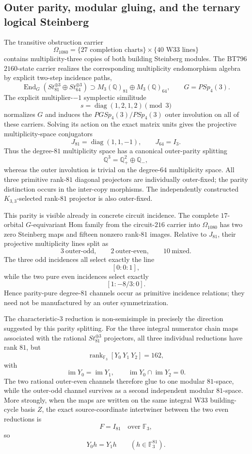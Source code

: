 
\subsection{Outer parity, modular gluing, and the ternary logical Steinberg}

The transitive obstruction carrier
\[
\Omega_{1080}=\{\text{$27$ completion charts}\}\times\{\text{$40$ W33 lines}\}
\]
contains multiplicity-three copies of both building Steinberg modules.  The
BT796 $2160$-state carrier realizes the corresponding multiplicity endomorphism
algebra by explicit two-step incidence paths,
\[
\operatorname{End}_{G}(St_{81}^{\oplus3}\oplus St_{64}^{\oplus3})
\supset M_3(\mathbb Q)_{81}\oplus M_3(\mathbb Q)_{64},
\qquad G=PSp_4(3).
\]
The explicit multiplier-$-1$ symplectic similitude
\[
s=\operatorname{diag}(1,2,1,2)\pmod3
\]
normalizes $G$ and induces the $PGSp_4(3)/PSp_4(3)$ outer involution on all of
these carriers.  Solving its action on the exact matrix units gives the
projective multiplicity-space conjugators
\[
J_{81}=\operatorname{diag}(1,1,-1),
\qquad
J_{64}=I_3.
\]
Thus the degree-$81$ multiplicity space has a canonical outer-parity splitting
\[
\mathbb Q^3=\mathbb Q^2_{+}\oplus\mathbb Q_{-},
\]
whereas the outer involution is trivial on the degree-$64$ multiplicity space.
All three primitive rank-$81$ diagonal projectors are individually outer-fixed;
the parity distinction occurs in the inter-copy morphisms.  The independently
constructed $K_{3,3}$-selected rank-$81$ projector is also outer-fixed.

This parity is visible already in concrete circuit incidence.  The complete
$17$-orbital $G$-equivariant Hom family from the circuit-$216$ carrier into
$\Omega_{1080}$ has two zero Steinberg maps and fifteen nonzero rank-$81$
images.  Relative to $J_{81}$, their projective multiplicity lines split as
\[
3\ \text{outer-odd},\qquad 2\ \text{outer-even},\qquad
10\ \text{mixed}.
\]
The three odd incidences all select exactly the line
\[
[0:0:1],
\]
while the two pure even incidences select exactly
\[
[1:-8/3:0].
\]
Hence parity-pure degree-$81$ channels occur as primitive incidence relations;
they need not be manufactured by an outer symmetrization.

The characteristic-$3$ reduction is non-semisimple in precisely the direction
suggested by this parity splitting.  For the three integral numerator chain
maps associated with the rational $St_{81}^{\oplus3}$ projectors, all three
individual reductions have rank $81$, but
\[
\operatorname{rank}_{\mathbb F_3}[Y_0\ Y_1\ Y_2]=162,
\]
with
\[
\operatorname{im}Y_0=\operatorname{im}Y_1,
\qquad
\operatorname{im}Y_0\cap\operatorname{im}Y_2=0.
\]
The two rational outer-even channels therefore glue to one modular $81$-space,
while the outer-odd channel survives as a second independent modular
$81$-space.  More strongly, when the maps are written on the same integral W33
building-cycle basis $Z$, the exact source-coordinate intertwiner between the
two even reductions is
\[
F=I_{81}\quad\text{over }\mathbb F_3,
\]
so
\[
Y_0h=Y_1h\qquad (h\in\mathbb F_3^{81}).
\]

